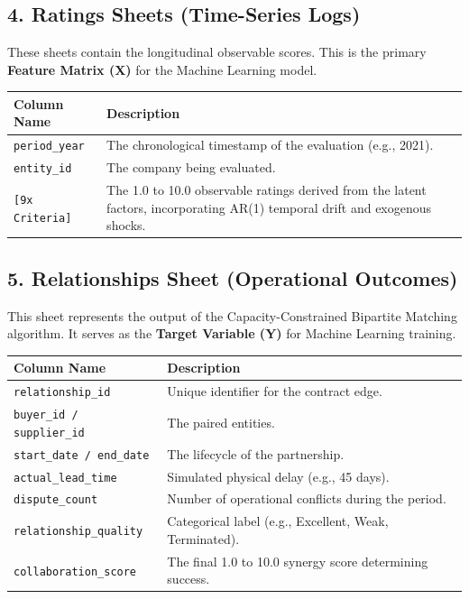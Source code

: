 \documentclass[11pt]{article}
\begin{document}
\subsection{4. Ratings Sheets (Time-Series Logs)}
These sheets contain the longitudinal observable scores. This is the primary \textbf{Feature Matrix (X)} for the Machine Learning model.
\begin{table}[h]
\centering
\begin{tabularx}{\textwidth}{lX}
\toprule
\textbf{Column Name} & \textbf{Description} \\
\midrule
\texttt{period\_year} & The chronological timestamp of the evaluation (e.g., 2021). \\
\texttt{entity\_id} & The company being evaluated. \\
\texttt{[9x Criteria]} & The 1.0 to 10.0 observable ratings derived from the latent factors, incorporating AR(1) temporal drift and exogenous shocks. \\
\bottomrule
\end{tabularx}
\end{table}

\subsection{5. Relationships Sheet (Operational Outcomes)}
This sheet represents the output of the Capacity-Constrained Bipartite Matching algorithm. It serves as the \textbf{Target Variable (Y)} for Machine Learning training.
\begin{table}[h]
\centering
\begin{tabularx}{\textwidth}{lX}
\toprule
\textbf{Column Name} & \textbf{Description} \\
\midrule
\texttt{relationship\_id} & Unique identifier for the contract edge. \\
\texttt{buyer\_id / supplier\_id} & The paired entities. \\
\texttt{start\_date / end\_date} & The lifecycle of the partnership. \\
\texttt{actual\_lead\_time} & Simulated physical delay (e.g., 45 days). \\
\texttt{dispute\_count} & Number of operational conflicts during the period. \\
\texttt{relationship\_quality} & Categorical label (e.g., Excellent, Weak, Terminated). \\
\texttt{collaboration\_score} & The final 1.0 to 10.0 synergy score determining success. \\
\bottomrule
\end{tabularx}
\end{table}
\end{document}

